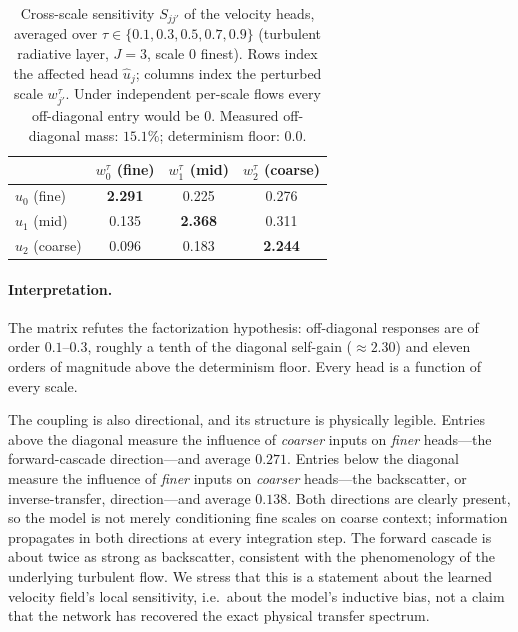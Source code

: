\begin{table}[t]
  \centering
  \caption{Cross-scale sensitivity $S_{jj'}$ of the velocity heads, averaged
    over $\tau\in\{0.1,0.3,0.5,0.7,0.9\}$ (turbulent radiative layer, $J=3$,
    scale $0$ finest). Rows index the affected head $\hat{u}_j$; columns index
    the perturbed scale $w^{\tau}_{j'}$. Under independent per-scale flows every
    off-diagonal entry would be $0$. Measured off-diagonal mass: $15.1\%$;
    determinism floor: $0.0$.}
  \label{tab:sensitivity}
  \begin{tabular}{lccc}
    \toprule
    & $w^{\tau}_0$ (fine) & $w^{\tau}_1$ (mid) & $w^{\tau}_2$ (coarse) \\
    \midrule
    $\hat{u}_0$ (fine)   & \textbf{2.291} & 0.225 & 0.276 \\
    $\hat{u}_1$ (mid)    & 0.135 & \textbf{2.368} & 0.311 \\
    $\hat{u}_2$ (coarse) & 0.096 & 0.183 & \textbf{2.244} \\
    \bottomrule
  \end{tabular}
\end{table}

\paragraph{Interpretation.}
The matrix refutes the factorization hypothesis: off-diagonal responses are of
order $0.1$--$0.3$, roughly a tenth of the diagonal self-gain ($\approx 2.30$)
and eleven orders of magnitude above the determinism floor. Every head is a
function of every scale.

The coupling is also directional, and its structure is physically legible.
Entries above the diagonal measure the influence of \emph{coarser} inputs on
\emph{finer} heads---the forward-cascade direction---and average $0.271$.
Entries below the diagonal measure the influence of \emph{finer} inputs on
\emph{coarser} heads---the backscatter, or inverse-transfer, direction---and
average $0.138$. Both directions are clearly present, so the model is not merely
conditioning fine scales on coarse context; information propagates in both
directions at every integration step. The forward cascade is about twice as
strong as backscatter, consistent with the phenomenology of the underlying
turbulent flow. We stress that this is a statement about the learned velocity
field's local sensitivity, i.e.\ about the model's inductive bias, not a claim
that the network has recovered the exact physical transfer spectrum.

